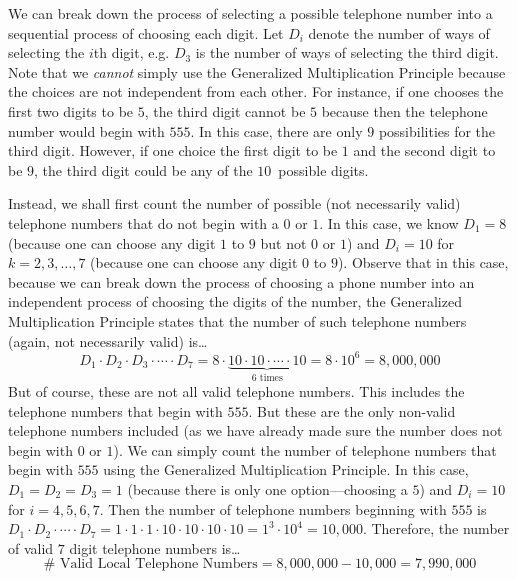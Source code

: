 \documentclass[11pt,letterpaper]{article}
\begin{document}
\sol We can break down the process of selecting a possible telephone number into a sequential process of choosing each digit. Let $D_i$ denote the number of ways of selecting the $i$th digit, e.g. $D_3$ is the number of ways of selecting the third digit. Note that we \textit{cannot} simply use the Generalized Multiplication Principle because the choices are not independent from each other. For instance, if one chooses the first two digits to be $5$, the third digit cannot be $5$ because then the telephone number would begin with $555$. In this case, there are only $9$ possibilities for the third digit. However, if one choice the first digit to be $1$ and the second digit to be $9$, the third digit could be any of the $10$~possible digits. \pspace

Instead, we shall first count the number of possible (not necessarily valid) telephone numbers that do not begin with a $0$ or $1$. In this case, we know $D_1= 8$ (because one can choose any digit $1$ to $9$ but not $0$ or $1$) and $D_i= 10$ for $k= 2, 3, \ldots, 7$ (because one can choose any digit $0$ to $9$). Observe that in this case, because we can break down the process of choosing a phone number into an independent process of choosing the digits of the number, the Generalized Multiplication Principle states that the number of such telephone numbers (again, not necessarily valid) is\dots
	\[
	D_1 \cdot D_2 \cdot D_3 \cdot \cdots \cdot D_7= 8 \cdot \underbrace{10 \cdot 10 \cdot \cdots \cdot 10}_{6 \text{ times}}= 8 \cdot 10^6= 8,\!000,\!000
	\]
But of course, these are not all valid telephone numbers. This includes the telephone numbers that begin with $555$. But these are the only non-valid telephone numbers included (as we have already made sure the number does not begin with $0$ or $1$). We can simply count the number of telephone numbers that begin with $555$ using the Generalized Multiplication Principle. In this case, $D_1= D_2= D_3= 1$ (because there is only one option---choosing a $5$) and $D_i= 10$ for $i= 4, 5, 6, 7$. Then the number of telephone numbers beginning with $555$ is $D_1 \cdot D_2 \cdot \cdots \cdot D_7= 1 \cdot 1 \cdot 1 \cdot 10 \cdot 10 \cdot 10 \cdot 10= 1^3 \cdot 10^4= 1{0,}000$. Therefore, the number of valid $7$ digit telephone numbers is\dots
	\[
	\# \text{ Valid Local Telephone Numbers}= 8,\!000,\!000 - 10,\!000= 7,\!990,\!000
	\]
\end{document}
